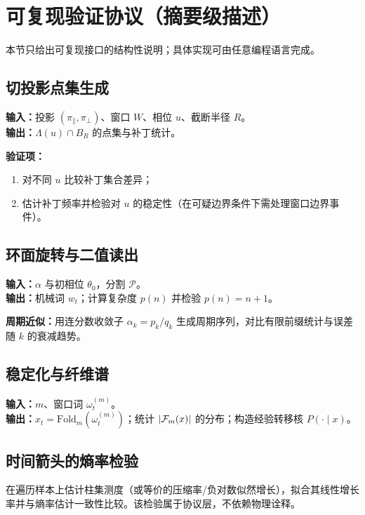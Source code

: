 \section{可复现验证协议（摘要级描述）}

本节只给出可复现接口的结构性说明；具体实现可由任意编程语言完成。

\subsection{切投影点集生成}

\textbf{输入：}投影 $(\pi_{\parallel},\pi_{\perp})$、窗口 $W$、相位 $u$、截断半径 $R$。\\
\textbf{输出：}$\Lambda(u)\cap B_R$ 的点集与补丁统计。

\textbf{验证项：}
\begin{enumerate}
  \item 对不同 $u$ 比较补丁集合差异；
  \item 估计补丁频率并检验对 $u$ 的稳定性（在可疑边界条件下需处理窗口边界事件）。
\end{enumerate}

\subsection{环面旋转与二值读出}

\textbf{输入：}$\alpha$ 与初相位 $\theta_0$，分割 $\mathcal{P}$。\\
\textbf{输出：}机械词 $w_t$；计算复杂度 $p(n)$ 并检验 $p(n)=n+1$。

\textbf{周期近似：}用连分数收敛子 $\alpha_k=p_k/q_k$ 生成周期序列，对比有限前缀统计与误差随 $k$ 的衰减趋势。

\subsection{稳定化与纤维谱}

\textbf{输入：}$m$、窗口词 $\omega_t^{(m)}$。\\
\textbf{输出：}$x_t=\mathrm{Fold}_m(\omega_t^{(m)})$；统计 $\left\lvert \mathcal{F}_m(x)\right\rvert$ 的分布；构造经验转移核 $P(\cdot\mid x)$。

\subsection{时间箭头的熵率检验}

在遍历样本上估计柱集测度（或等价的压缩率/负对数似然增长），拟合其线性增长率并与熵率估计一致性比较。该检验属于协议层，不依赖物理诠释。

